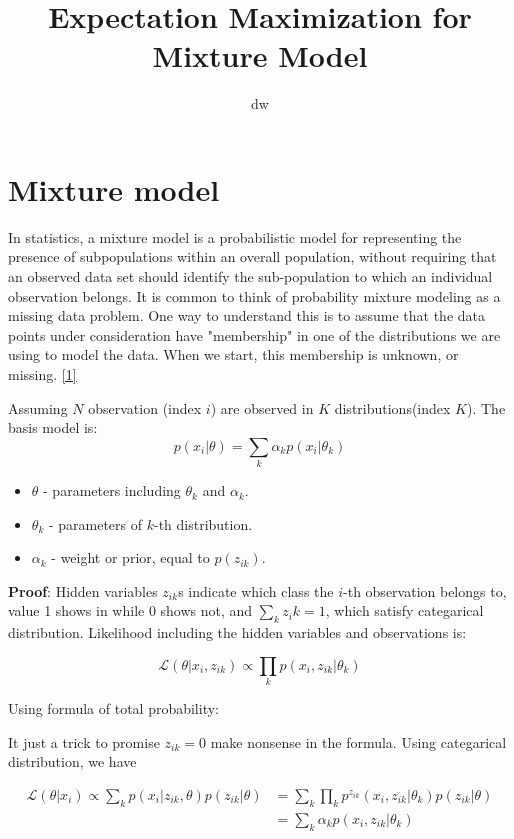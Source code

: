 \documentclass{article}
\title{Expectation Maximization for Mixture Model}
\author{dw}
\begin{document}
\maketitle
\section{Mixture model}
In statistics, a mixture model is a probabilistic model for representing the presence of subpopulations within an overall population, without requiring that an observed data set should identify the sub-population to which an individual observation belongs. It is common to think of probability mixture modeling as a missing data problem. One way to understand this is to assume that the data points under consideration have "membership" in one of the distributions we are using to model the data. When we start, this membership is unknown, or missing. \href{https://en.wikipedia.org/wiki/Mixture_model}{[1]}

Assuming $N$ observation (index $i$) are observed in $K$ distributions(index $K$). The basis model is:
\begin{equation}
	p(x_i|\theta) = \sum_k \alpha_k p(x_i| \theta_k)
\end{equation}

\begin{itemize}
	\item $\theta$ - parameters including $\theta_k$ and $\alpha_k$.
	\item $\theta_k$ - parameters of $k$-th distribution.
	\item $\alpha_k$ - weight or prior, equal to $p(z_{ik})$.
\end{itemize}

\textbf{Proof}:
Hidden variables $z_{ik}$s indicate which class the $i$-th observation belongs to, value 1 shows in while 0 shows not, and $\sum_k {z_ik} = 1$, which satisfy categarical distribution.
Likelihood including the hidden variables and observations is:

\begin{equation}
	\mathcal{L}(\theta|x_i, z_{ik}) \propto \prod_k p(x_i,z_{ik}|\theta_k)
\end{equation}

Using formula of total probability:

It just a trick to promise $z_{ik}=0$ make nonsense in the formula. Using categarical distribution, we have

\begin{equation}
	\begin{aligned}
		\mathcal{L}(\theta|x_i) \propto \sum_k p(x_i | z_{ik}, \theta) p(z_{ik} | \theta)
		  & = \sum_k \prod_k p^{z_{ik}}(x_i,z_{ik}|\theta_k) p(z_{ik}|\theta) \\
		  & = \sum_k \alpha_k p(x_i,z_{ik}|\theta_k)
	\end{aligned}
\end{equation}
\end{document}
